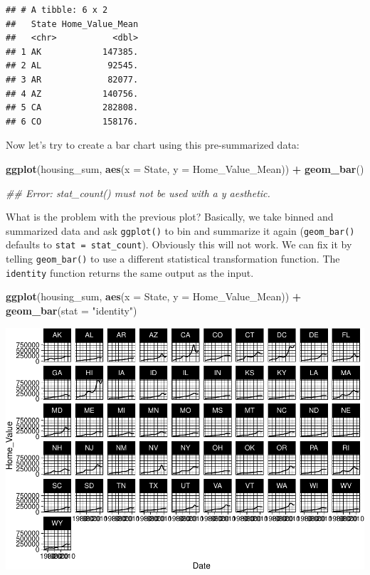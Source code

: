 \documentclass[
]{book}
\newenvironment{Shaded}{\begin{snugshade}}{\end{snugshade}}
\newcommand{\CommentTok}[1]{\textcolor[rgb]{0.56,0.35,0.01}{\textit{#1}}}
\newcommand{\DataTypeTok}[1]{\textcolor[rgb]{0.13,0.29,0.53}{#1}}
\newcommand{\KeywordTok}[1]{\textcolor[rgb]{0.13,0.29,0.53}{\textbf{#1}}}
\newcommand{\NormalTok}[1]{#1}
\newcommand{\OperatorTok}[1]{\textcolor[rgb]{0.81,0.36,0.00}{\textbf{#1}}}
\newcommand{\StringTok}[1]{\textcolor[rgb]{0.31,0.60,0.02}{#1}}
\begin{document}
\begin{verbatim}
## # A tibble: 6 x 2
##   State Home_Value_Mean
##   <chr>           <dbl>
## 1 AK            147385.
## 2 AL             92545.
## 3 AR             82077.
## 4 AZ            140756.
## 5 CA            282808.
## 6 CO            158176.
\end{verbatim}

Now let's try to create a bar chart using this pre-summarized data:

\begin{Shaded}
\begin{Highlighting}[]
\KeywordTok{ggplot}\NormalTok{(housing\_sum, }\KeywordTok{aes}\NormalTok{(}\DataTypeTok{x =}\NormalTok{ State, }\DataTypeTok{y =}\NormalTok{ Home\_Value\_Mean)) }\OperatorTok{+}\StringTok{ }
\StringTok{  }\KeywordTok{geom\_bar}\NormalTok{()}

\CommentTok{\#\# Error: stat\_count() must not be used with a y aesthetic.  }
\end{Highlighting}
\end{Shaded}

What is the problem with the previous plot? Basically, we take binned and summarized data and ask \texttt{ggplot()} to bin and summarize it again (\texttt{geom\_bar()} defaults to \texttt{stat\ =\ stat\_count}). Obviously this will not work. We can fix it by telling \texttt{geom\_bar()} to use a different statistical transformation function. The \texttt{identity} function returns the same output as the input.

\begin{Shaded}
\begin{Highlighting}[]
\KeywordTok{ggplot}\NormalTok{(housing\_sum, }\KeywordTok{aes}\NormalTok{(}\DataTypeTok{x =}\NormalTok{ State, }\DataTypeTok{y =}\NormalTok{ Home\_Value\_Mean)) }\OperatorTok{+}\StringTok{ }
\StringTok{  }\KeywordTok{geom\_bar}\NormalTok{(}\DataTypeTok{stat =} \StringTok{"identity"}\NormalTok{)}
\end{Highlighting}
\end{Shaded}

\includegraphics{R/Rgraphics/figures/unnamed-chunk-182-1.pdf}
\end{document}
